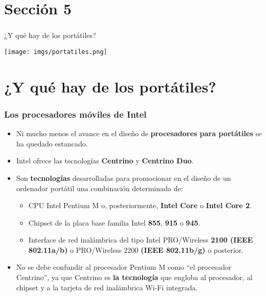 \section*{Sección 5}
\frame
{
\frametitle{}
\begin{center}
\begin{huge}
\hspace*{1cm}¿Y qué hay de los portátiles?\newline
\end{huge}
\texttt{[image: imgs/portatiles.png]}
\end{center}
}

\section{¿Y qué hay de los portátiles?}
\frame
{
\frametitle{Los procesadores móviles de Intel}
\begin{itemize}
 \item Ni mucho menos el avance en el diseño de \textbf{procesadores para portátiles} se ha quedado estancado.
 \item Intel ofrece las tecnologías \textbf{Centrino} y \textbf{Centrino Duo}.
 \item Son \textbf{tecnologías} desarrolladas para promocionar en el diseño de un ordenador portátil una combinación determinada de:

	\begin{itemize}
	\item CPU Intel Pentium M o, posteriormente, \textbf{Intel Core} o \textbf{Intel Core 2}.
	\item Chipset de la placa base familia Intel \textbf{855}, \textbf{915} o \textbf{945}.
	\item Interface de red inalámbrica del tipo Intel PRO/Wireless \textbf{2100 (IEEE 802.11a/b)} o PRO/Wireless 2200 \textbf{(IEEE 802.11b/g)} o posterior.
	\end{itemize}

 \item No se debe confundir al procesador Pentium M como ``el procesador Centrino'', ya que Centrino es \textbf{la tecnología} que engloba al procesador, al chipset y a la tarjeta de red inalámbrica Wi-Fi integrada.

\end{itemize}
}

